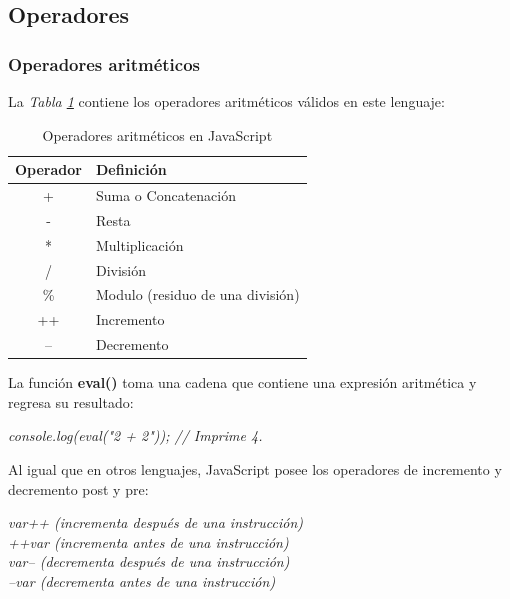 \subsection{Operadores}

\subsubsection{Operadores aritméticos}
\hspace{0.55cm}La \textit{Tabla \ref{tab: 2}} contiene los operadores aritméticos válidos en este lenguaje:
\begin{table}[H]
    \begin{center}
        \caption{Operadores aritméticos en JavaScript}
        \label{tab: 2}
        \begin{tabular}{c l}
            \hline
            \textbf{Operador}&\textbf{Definición} \\
            \hline
            + & Suma o Concatenación \\
            - & Resta \\
            * & Multiplicación \\
            / & División \\
            \% & Modulo (residuo de una división) \\
            ++ & Incremento \\
            -- & Decremento \\
            \hline
        \end{tabular}
    \end{center}
\end{table}

La función \textbf{eval()} toma una cadena que contiene una expresión aritmética y regresa su resultado:
\begin{center}
    \textit{console.log(eval("2 + 2")); // Imprime 4.}
\end{center}

Al igual que en otros lenguajes, JavaScript posee los operadores de incremento y decremento post y pre:
\begin{center}
    \textit{
            var++ (incrementa después de una instrucción) \\
            ++var (incrementa antes de una instrucción) \\
            var-- (decrementa después de una instrucción) \\
            --var (decrementa antes de una instrucción) \\
    }
\end{center}


